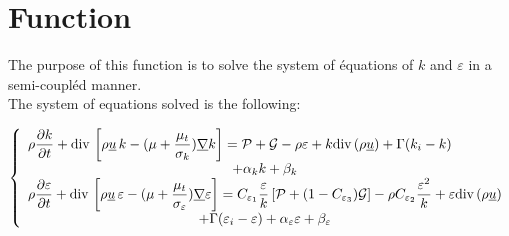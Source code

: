 
%
%
%
%


\label{ap:turbke}

\hypertarget{cs\_turbulence\_ke}{}

\vspace{1cm}
\section*{Function}
The purpose of this function is to solve the system of \'equations of
$k$ and $\varepsilon$ in a semi-coupl\'ed manner.\\
The system of equations solved is the following:

\begin{equation}
\left\{\begin{array}{l}
\displaystyle
\rho\frac{\partial k}{\partial t} +
\dive\left[\rho \vect{u}\,k-(\mu+\frac{\mu_t}{\sigma_k})\grad{k}\right] =
\mathcal{P}+\mathcal{G}-\rho\varepsilon+k\dive(\rho\vect{u})
+\Gamma(k_i-k)\\
\multicolumn{1}{c}{+\alpha_k k +\beta_k}\\
\displaystyle
\rho\frac{\partial \varepsilon}{\partial t} +
\dive\left[\rho \vect{u}\,\varepsilon-
(\mu+\frac{\mu_t}{\sigma_\varepsilon})\grad{\varepsilon}\right] =
C_{\varepsilon_1}\frac{\varepsilon}{k}\left[\mathcal{P}
+(1-C_{\varepsilon_3})\mathcal{G}\right]
-\rho C_{\varepsilon_2}\frac{\varepsilon^2}{k}
+\varepsilon\dive(\rho\vect{u})\\
\multicolumn{1}{c}{+\Gamma(\varepsilon_i-\varepsilon)
+\alpha_\varepsilon \varepsilon +\beta_\varepsilon}
\end{array}\right.
\end{equation}

